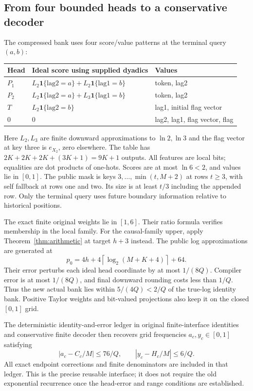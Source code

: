 \documentclass[11pt,letterpaper]{article}
\theoremstyle{definition}\newtheorem{definition}[theorem]{Definition}
\theoremstyle{remark}\newtheorem{remark}[theorem]{Remark}
\newcommand{\ind}{\mathbf{1}}
\newcommand{\ceil}[1]{\left\lceil #1\right\rceil}
\begin{document}
\subsection{From four bounded heads to a conservative decoder}
The compressed bank uses four score/value patterns at the terminal query $(a,b)$:
\begin{center}\small
\begin{tabular}{@{}lll@{}}\toprule
Head & Ideal score using supplied dyadics & Values\\\midrule
$P_1$ & $L_2\ind\{\mathrm{lag2}=a\}+L_2\ind\{\mathrm{lag1}=b\}$ & token, lag2\\
$P_2$ & $L_2\ind\{\mathrm{lag2}=a\}+L_3\ind\{\mathrm{lag1}=b\}$ & token, lag2\\
$T$ & $L_2\ind\{\mathrm{lag2}=b\}$ & lag1, initial flag vector\\
$0$ & $0$ & lag2, lag1, flag vector, flag\\\bottomrule
\end{tabular}
\end{center}
Here $L_2,L_3$ are finite downward approximations to $\ln2,\ln3$ and the flag vector at key three is $e_{X_2}$, zero elsewhere. The table has $2K+2K+2K+(3K+1)=9K+1$ outputs. All features are local bits; equalities are dot products of one-hots. Scores are at most $\ln6<2$, and values lie in $[0,1]$. The public mask is keys $3,\ldots,\min(t,M+2)$ at rows $t\ge3$, with self fallback at rows one and two. Its size is at least $t/3$ including the appended row. Only the terminal query uses future boundary information relative to historical positions.

The exact finite original weights lie in $[1,6]$. Their ratio formula verifies membership in the local family. For the causal-family upper, apply Theorem~\ref{thm:arithmetic} at target $h+3$ instead. The public log approximations are generated at
\[
 p_0=4h+4\ceil{\log_2(M+K+4)}+64.
\]
Their error perturbs each ideal head coordinate by at most $1/(8Q)$. Compiler error is at most $1/(8Q)$, and final downward rounding costs less than $1/Q$. Thus the new actual bank lies within $5/(4Q)<2/Q$ of the true-log identity bank. Positive Taylor weights and bit-valued projections also keep it on the closed $[0,1]$ grid.

The deterministic identity-and-error ledger in original finite-interface identities and conservative finite decoder then recovers grid frequencies $a_c,y_c\in[0,1]$ satisfying
\begin{equation}\label{eq:freq}
 |a_c-C_c/M|\le76/Q,\qquad |y_c-H_c/M|\le6/Q.
\end{equation}
All exact endpoint corrections and finite denominators are included in that ledger. This is the precise reusable interface; it does not require the old exponential recurrence once the head-error and range conditions are established.
\end{document}
